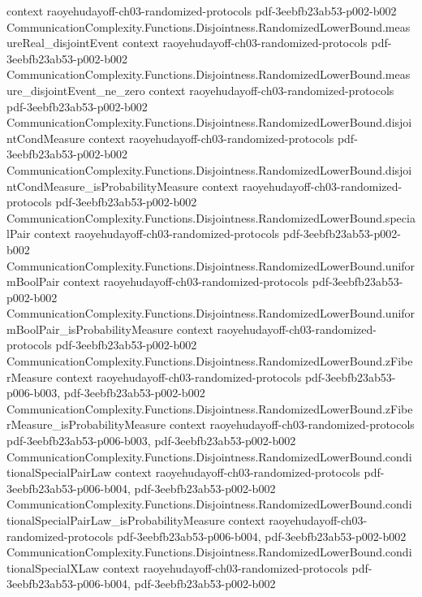 \begin{theorem}
  {context}
  {raoyehudayoff-ch03-randomized-protocols}
  {pdf-3eebfb23ab53-p002-b002}
\proofstep
  {CommunicationComplexity.Functions.Disjointness.RandomizedLowerBound.measureReal_disjointEvent}
  {context}
  {raoyehudayoff-ch03-randomized-protocols}
  {pdf-3eebfb23ab53-p002-b002}
\proofstep
  {CommunicationComplexity.Functions.Disjointness.RandomizedLowerBound.measure_disjointEvent_ne_zero}
  {context}
  {raoyehudayoff-ch03-randomized-protocols}
  {pdf-3eebfb23ab53-p002-b002}
\proofstep
  {CommunicationComplexity.Functions.Disjointness.RandomizedLowerBound.disjointCondMeasure}
  {context}
  {raoyehudayoff-ch03-randomized-protocols}
  {pdf-3eebfb23ab53-p002-b002}
\proofstep
  {CommunicationComplexity.Functions.Disjointness.RandomizedLowerBound.disjointCondMeasure_isProbabilityMeasure}
  {context}
  {raoyehudayoff-ch03-randomized-protocols}
  {pdf-3eebfb23ab53-p002-b002}
\proofstep
  {CommunicationComplexity.Functions.Disjointness.RandomizedLowerBound.specialPair}
  {context}
  {raoyehudayoff-ch03-randomized-protocols}
  {pdf-3eebfb23ab53-p002-b002}
\proofstep
  {CommunicationComplexity.Functions.Disjointness.RandomizedLowerBound.uniformBoolPair}
  {context}
  {raoyehudayoff-ch03-randomized-protocols}
  {pdf-3eebfb23ab53-p002-b002}
\proofstep
  {CommunicationComplexity.Functions.Disjointness.RandomizedLowerBound.uniformBoolPair_isProbabilityMeasure}
  {context}
  {raoyehudayoff-ch03-randomized-protocols}
  {pdf-3eebfb23ab53-p002-b002}
\proofstep
  {CommunicationComplexity.Functions.Disjointness.RandomizedLowerBound.zFiberMeasure}
  {context}
  {raoyehudayoff-ch03-randomized-protocols}
  {pdf-3eebfb23ab53-p006-b003,
    pdf-3eebfb23ab53-p002-b002}
\proofstep
  {CommunicationComplexity.Functions.Disjointness.RandomizedLowerBound.zFiberMeasure_isProbabilityMeasure}
  {context}
  {raoyehudayoff-ch03-randomized-protocols}
  {pdf-3eebfb23ab53-p006-b003,
    pdf-3eebfb23ab53-p002-b002}
\proofstep
  {CommunicationComplexity.Functions.Disjointness.RandomizedLowerBound.conditionalSpecialPairLaw}
  {context}
  {raoyehudayoff-ch03-randomized-protocols}
  {pdf-3eebfb23ab53-p006-b004,
    pdf-3eebfb23ab53-p002-b002}
\proofstep
  {CommunicationComplexity.Functions.Disjointness.RandomizedLowerBound.conditionalSpecialPairLaw_isProbabilityMeasure}
  {context}
  {raoyehudayoff-ch03-randomized-protocols}
  {pdf-3eebfb23ab53-p006-b004,
    pdf-3eebfb23ab53-p002-b002}
\proofstep
  {CommunicationComplexity.Functions.Disjointness.RandomizedLowerBound.conditionalSpecialXLaw}
  {context}
  {raoyehudayoff-ch03-randomized-protocols}
  {pdf-3eebfb23ab53-p006-b004,
    pdf-3eebfb23ab53-p002-b002}

\end{theorem}
